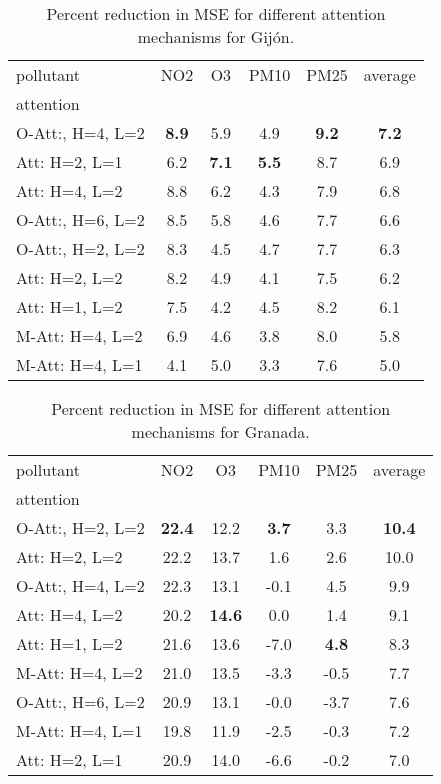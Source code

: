 \begin{table}
\begin{center}
\begin{tabular}{lccccc}
\toprule
pollutant & NO2 & O3 & PM10 & PM25 & average \\
attention &  &  &  &  &  \\
\midrule
O-Att:, H=4, L=2 & \textbf{8.9} & 5.9 & 4.9 & \textbf{9.2} & \textbf{7.2} \\
Att: H=2, L=1 & 6.2 & \textbf{7.1} & \textbf{5.5} & 8.7 & 6.9 \\
Att: H=4, L=2 & 8.8 & 6.2 & 4.3 & 7.9 & 6.8 \\
O-Att:, H=6, L=2 & 8.5 & 5.8 & 4.6 & 7.7 & 6.6 \\
O-Att:, H=2, L=2 & 8.3 & 4.5 & 4.7 & 7.7 & 6.3 \\
Att: H=2, L=2 & 8.2 & 4.9 & 4.1 & 7.5 & 6.2 \\
Att: H=1, L=2 & 7.5 & 4.2 & 4.5 & 8.2 & 6.1 \\
M-Att: H=4, L=2 & 6.9 & 4.6 & 3.8 & 8.0 & 5.8 \\
M-Att: H=4, L=1 & 4.1 & 5.0 & 3.3 & 7.6 & 5.0 \\
\bottomrule
\end{tabular}
\end{center}
\caption{Percent reduction in MSE for different attention mechanisms for Gijón.}
\label{tab:MSEGainByCityGijon}
\end{table}



\begin{table}
\begin{center}
\begin{tabular}{lccccc}
\toprule
pollutant & NO2 & O3 & PM10 & PM25 & average \\
attention &  &  &  &  &  \\
\midrule
O-Att:, H=2, L=2 & \textbf{22.4} & 12.2 & \textbf{3.7} & 3.3 & \textbf{10.4} \\
Att: H=2, L=2 & 22.2 & 13.7 & 1.6 & 2.6 & 10.0 \\
O-Att:, H=4, L=2 & 22.3 & 13.1 & -0.1 & 4.5 & 9.9 \\
Att: H=4, L=2 & 20.2 & \textbf{14.6} & 0.0 & 1.4 & 9.1 \\
Att: H=1, L=2 & 21.6 & 13.6 & -7.0 & \textbf{4.8} & 8.3 \\
M-Att: H=4, L=2 & 21.0 & 13.5 & -3.3 & -0.5 & 7.7 \\
O-Att:, H=6, L=2 & 20.9 & 13.1 & -0.0 & -3.7 & 7.6 \\
M-Att: H=4, L=1 & 19.8 & 11.9 & -2.5 & -0.3 & 7.2 \\
Att: H=2, L=1 & 20.9 & 14.0 & -6.6 & -0.2 & 7.0 \\
\bottomrule
\end{tabular}
\end{center}
\caption{Percent reduction in MSE for different attention mechanisms for Granada.}
\label{tab:MSEGainByCityGranada}
\end{table}





